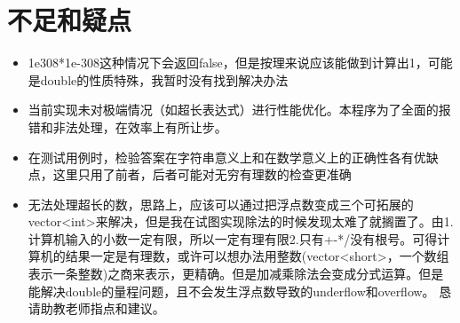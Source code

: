 \documentclass[12pt,a4paper]{article}
\begin{document}
\section{不足和疑点}
\begin{itemize}
    \item 1e308*1e-308这种情况下会返回false，但是按理来说应该能做到计算出1，可能是double的性质特殊，我暂时没有找到解决办法
    \item 当前实现未对极端情况（如超长表达式）进行性能优化。本程序为了全面的报错和非法处理，在效率上有所让步。
    \item 在测试用例时，检验答案在字符串意义上和在数学意义上的正确性各有优缺点，这里只用了前者，后者可能对无穷有理数的检查更准确
    \item 无法处理超长的数，思路上，应该可以通过把浮点数变成三个可拓展的vector<int>来解决，但是我在试图实现除法的时候发现太难了就搁置了。由1.计算机输入的小数一定有限，所以一定有理有限2.只有+-*/没有根号。可得计算机的结果一定是有理数，或许可以想办法用整数(vector<short>，一个数组表示一条整数)之商来表示，更精确。但是加减乘除法会变成分式运算。但是能解决double的量程问题，且不会发生浮点数导致的underflow和overflow。
    恳请助教老师指点和建议。
\end{itemize}
\end{document}
